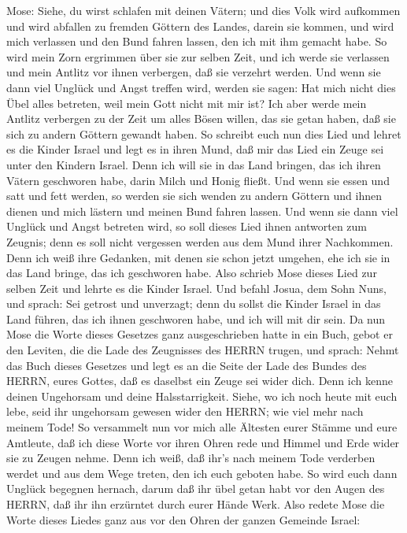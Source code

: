 Mose: Siehe, du wirst schlafen mit deinen Vätern; und dies Volk wird
aufkommen und wird abfallen zu fremden Göttern des Landes, darein sie
kommen, und wird mich verlassen und den Bund fahren lassen, den ich mit
ihm gemacht habe.  So wird mein Zorn ergrimmen über sie zur
selben Zeit, und ich werde sie verlassen und mein Antlitz vor ihnen
verbergen, daß sie verzehrt werden. Und wenn sie dann viel Unglück und
Angst treffen wird, werden sie sagen: Hat mich nicht dies Übel alles
betreten, weil mein Gott nicht mit mir ist?  Ich aber werde
mein Antlitz verbergen zu der Zeit um alles Bösen willen, das sie getan
haben, daß sie sich zu andern Göttern gewandt haben.  So
schreibt euch nun dies Lied und lehret es die Kinder Israel und legt es
in ihren Mund, daß mir das Lied ein Zeuge sei unter den Kindern Israel.
 Denn ich will sie in das Land bringen, das ich ihren
Vätern geschworen habe, darin Milch und Honig fließt. Und wenn sie essen
und satt und fett werden, so werden sie sich wenden zu andern Göttern
und ihnen dienen und mich lästern und meinen Bund fahren lassen.
 Und wenn sie dann viel Unglück und Angst betreten wird, so
soll dieses Lied ihnen antworten zum Zeugnis; denn es soll nicht
vergessen werden aus dem Mund ihrer Nachkommen. Denn ich weiß ihre
Gedanken, mit denen sie schon jetzt umgehen, ehe ich sie in das Land
bringe, das ich geschworen habe.  Also schrieb Mose dieses
Lied zur selben Zeit und lehrte es die Kinder Israel.  Und
befahl Josua, dem Sohn Nuns, und sprach: Sei getrost und unverzagt; denn
du sollst die Kinder Israel in das Land führen, das ich ihnen geschworen
habe, und ich will mit dir sein.  Da nun Mose die Worte
dieses Gesetzes ganz ausgeschrieben hatte in ein Buch, 
gebot er den Leviten, die die Lade des Zeugnisses des HERRN trugen, und
sprach:  Nehmt das Buch dieses Gesetzes und legt es an die
Seite der Lade des Bundes des HERRN, eures Gottes, daß es daselbst ein
Zeuge sei wider dich.  Denn ich kenne deinen Ungehorsam und
deine Halsstarrigkeit. Siehe, wo ich noch heute mit euch lebe, seid ihr
ungehorsam gewesen wider den HERRN; wie viel mehr nach meinem Tode!
 So versammelt nun vor mich alle Ältesten eurer Stämme und
eure Amtleute, daß ich diese Worte vor ihren Ohren rede und Himmel und
Erde wider sie zu Zeugen nehme.  Denn ich weiß, daß ihr's
nach meinem Tode verderben werdet und aus dem Wege treten, den ich euch
geboten habe. So wird euch dann Unglück begegnen hernach, darum daß ihr
übel getan habt vor den Augen des HERRN, daß ihr ihn erzürntet durch
eurer Hände Werk.  Also redete Mose die Worte dieses Liedes
ganz aus vor den Ohren der ganzen Gemeinde Israel:

